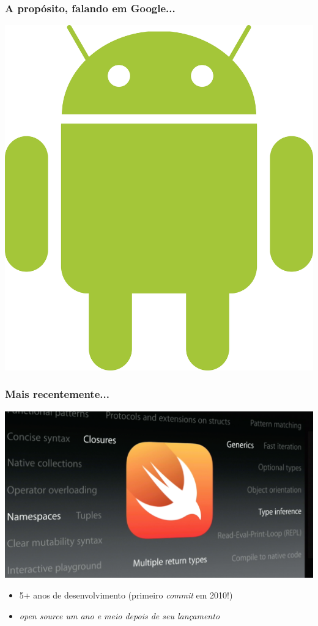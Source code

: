 \documentclass[xcolor=dvipsnames]{beamer}
\begin{document}
\begin{frame}
	\frametitle{A propósito, falando em Google...}
 	\includegraphics[scale=0.22]{android-logo.png}	
\end{frame}


\begin{frame}
	\frametitle{Mais recentemente...}
 	\includegraphics[scale=0.22]{swift_logo.png}	
    \begin{itemize}
      \item 5+ anos de desenvolvimento (primeiro \textit{commit} em 2010!)
      \item \textit{open source um ano e meio depois de seu lançamento}
    \end{itemize}
\end{frame}
\end{document}
